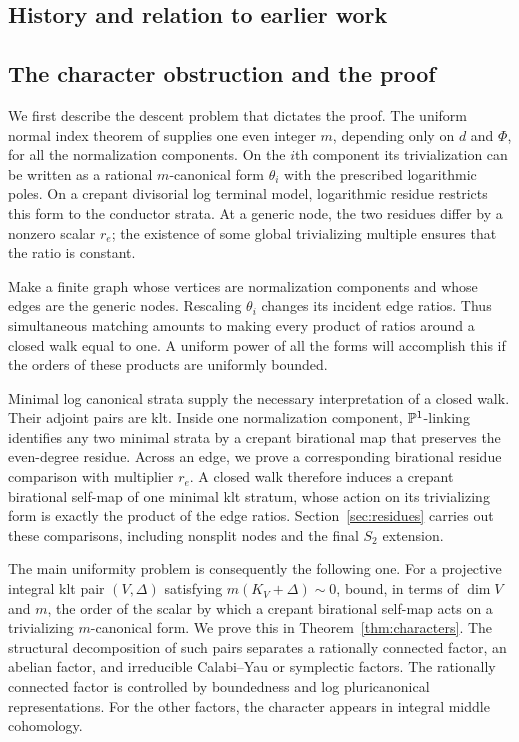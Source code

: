 \subsection{History and relation to earlier work}


\subsection{The character obstruction and the proof}

We first describe the descent problem that dictates the proof.
The uniform normal index theorem of \citet[Theorem~1.2]{UPI} supplies
one even integer $m$, depending only on $d$ and $\Phi$, for all the
normalization components. On the $i$th component its trivialization can
be written as a rational $m$-canonical form $\theta_i$ with the prescribed
logarithmic poles. On a crepant divisorial log terminal model, logarithmic
residue restricts this form to the conductor strata. At a generic node,
the two residues differ by a nonzero scalar $r_e$; the existence of some
global trivializing multiple ensures that the ratio is constant.

Make a finite graph whose vertices are normalization components and whose
edges are the generic nodes. Rescaling $\theta_i$ changes its incident
edge ratios. Thus simultaneous matching amounts to making every product
of ratios around a closed walk equal to one. A uniform power of all the
forms will accomplish this if the orders of these products are uniformly
bounded.

Minimal log canonical strata supply the necessary interpretation of a
closed walk. Their adjoint pairs are klt. Inside one normalization
component, $\mathbb P^1$-linking identifies any two minimal strata by a crepant
birational map that preserves the even-degree residue. Across an edge,
we prove a corresponding birational residue comparison with multiplier
$r_e$. A closed walk therefore induces a crepant birational self-map of
one minimal klt stratum, whose action on its trivializing form is exactly
the product of the edge ratios. Section~\ref{sec:residues} carries out
these comparisons, including nonsplit nodes and the final $S_2$ extension.

The main uniformity problem is consequently the following one. For a
projective integral klt pair $(V,\Delta)$ satisfying
$m(K_V+\Delta)\sim0$, bound, in terms of $\dim V$ and $m$, the order of
the scalar by which a crepant birational self-map acts on a trivializing
$m$-canonical form. We prove this in Theorem~\ref{thm:characters}.
The structural decomposition of such pairs separates a rationally
connected factor, an abelian factor, and irreducible Calabi--Yau or
symplectic factors. The rationally connected factor is controlled by
boundedness and log pluricanonical representations. For the other factors,
the character appears in integral middle cohomology.

